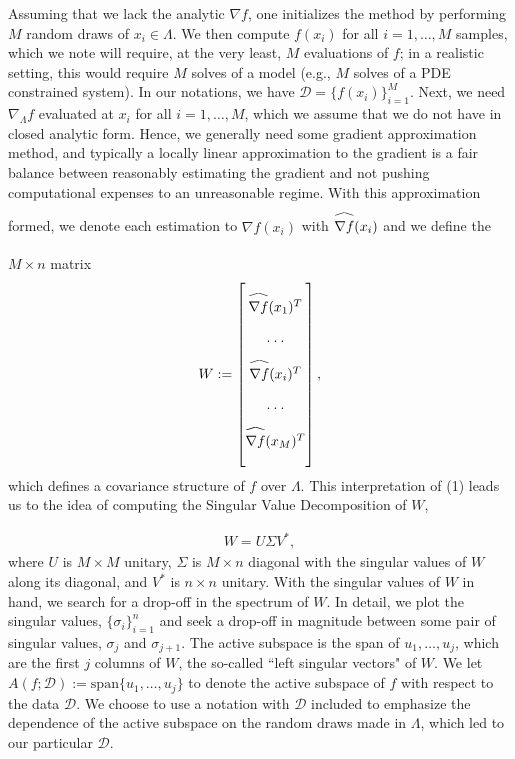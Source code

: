 \documentclass{amsart}
\newcommand\reallywidehat[1]{\arraycolsep=0pt\relax%
\begin{array}{c}
\stretchto{
  \scaleto{
    \scalerel*[\widthof{\ensuremath{#1}}]{\kern-.5pt\bigwedge\kern-.5pt}
    {\rule[-\textheight/2]{1ex}{\textheight}} %
  }{\textheight} %
}{0.5ex}\\           %
#1\\                 %
\rule{-1ex}{0ex}
\end{array}
}
\begin{document}
\noindent Assuming that we lack the analytic $\nabla f$, one initializes the method by performing $M$ random draws of $x_i \in \Lambda$. We then compute $f(x_i)$ for all $i=1,\ldots,M$ samples, which we note will require, at the very least, $M$ evaluations of $f$; in a realistic setting, this would require $M$ solves of a model (e.g., $M$ solves of a PDE constrained system). In our notations, we have $\mathcal{D}=\{f(x_i)\}_{i=1}^M$. Next, we need $\nabla_\Lambda f$ evaluated at $x_i$ for all $i=1,\ldots,M$, which we assume that we do not have in closed analytic form. Hence, we generally need some gradient approximation method, and typically a locally linear approximation to the gradient is a fair balance between reasonably estimating the gradient and not pushing computational expenses to an unreasonable regime. With this approximation formed, we denote each estimation to $\nabla f(x_i)$ with $\reallywidehat{\nabla f}(x_i)$ and we define the $M \times n$ matrix
\begin{eqnarray}
W:=\begin{bmatrix}
\reallywidehat{\nabla f}(x_1)^T\\
\cdot \cdot \cdot\\
\reallywidehat{\nabla f}(x_i)^T\\
\cdot \cdot \cdot \\
\reallywidehat{\nabla f}(x_M)^T\\
\end{bmatrix},
\end{eqnarray} which defines a covariance structure of $f$ over $\Lambda$. This interpretation of (1) leads us to the idea of computing the Singular Value Decomposition of $W$,

\begin{eqnarray}
W=U\Sigma V^*,
\end{eqnarray} where $U$ is $M \times M$ unitary, $\Sigma$ is $M \times n$ diagonal with the singular values of $W$ along its diagonal, and $V^*$ is $n \times n$ unitary. With the singular values of $W$ in hand, we search for a drop-off in the spectrum of $W$. In detail, we plot the singular values, $\{\sigma_i\}_{i=1}^n$ and seek a drop-off in magnitude between some pair of singular values, $\sigma_{j}$ and $\sigma_{j+1}$. The active subspace is the span of $u_1,\ldots,u_{j}$, which are the first $j$ columns of $W$, the so-called ``left singular vectors" of $W$. We let $A\left(f;\mathcal{D}\right):=\text{span}\{u_1,\ldots,u_{j}\}$ to denote the active subspace of $f$ with respect to the data $\mathcal{D}$. We choose to use a notation with $\mathcal{D}$ included to emphasize the dependence of the active subspace on the random draws made in $\Lambda$, which led to our particular $\mathcal{D}$.
\end{document}
